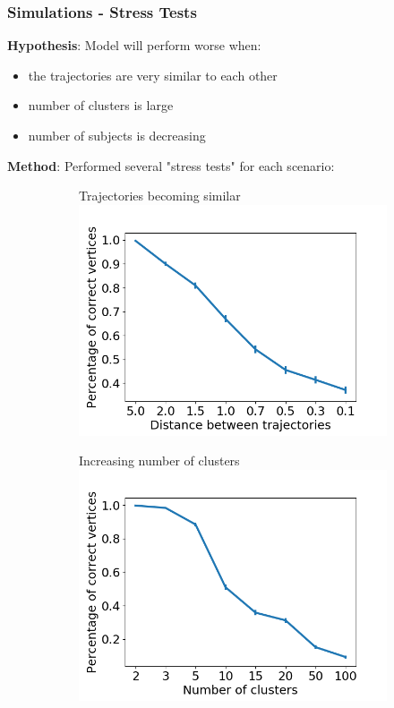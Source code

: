 \documentclass[8pt,xcolor=table]{beamer}
\begin{document}
\begin{frame}
\frametitle{Simulations - Stress Tests}


 \textbf{Hypothesis}: Model will perform worse when:
 \begin{itemize}
  \item the trajectories are very similar to each other
  \item number of clusters is large
  \item number of subjects is decreasing
 \end{itemize}

 
 \textbf{Method}: Performed several "stress tests" for each scenario:

 \begin{figure}
\centering
\begin{subfigure}{0.3\textwidth}
\centering
\small{Trajectories becoming similar}\\
\includegraphics[scale=0.22]{figures/synth/correctVertices_trajCent}
\caption{}
\end{subfigure}
\begin{subfigure}{0.3\textwidth}
\centering
\small{Increasing number of clusters}
\includegraphics[scale=0.22]{figures/synth/correctVertices_nrClust}

\end{subfigure}
\end{figure}
\end{frame}
\end{document}
